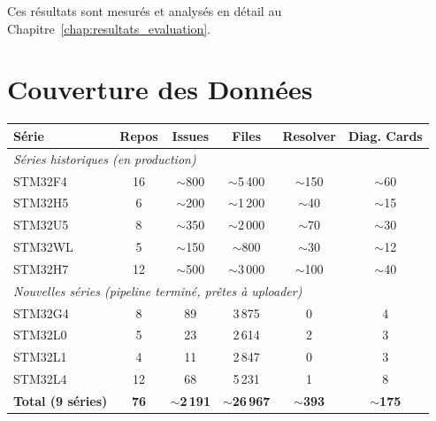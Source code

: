 \documentclass[12pt,a4paper]{report}
\begin{document}
Ces résultats sont mesurés et analysés en détail au Chapitre~\ref{chap:resultats_evaluation}.





\iffalse

\section{Couverture des Données}

\begin{longtable}{lccccc}
\toprule
\textbf{Série} & \textbf{Repos} & \textbf{Issues} & \textbf{Files} & \textbf{Resolver} & \textbf{Diag. Cards} \\
\midrule
\multicolumn{6}{l}{\textit{Séries historiques (en production)}} \\
STM32F4 & 16 & $\sim$800 & $\sim$5\,400 & $\sim$150 & $\sim$60 \\
STM32H5 & 6 & $\sim$200 & $\sim$1\,200 & $\sim$40 & $\sim$15 \\
STM32U5 & 8 & $\sim$350 & $\sim$2\,000 & $\sim$70 & $\sim$30 \\
STM32WL & 5 & $\sim$150 & $\sim$800 & $\sim$30 & $\sim$12 \\
STM32H7 & 12 & $\sim$500 & $\sim$3\,000 & $\sim$100 & $\sim$40 \\
\midrule
\multicolumn{6}{l}{\textit{Nouvelles séries (pipeline terminé, prêtes à uploader)}} \\
STM32G4 & 8 & 89 & 3\,875 & 0 & 4 \\
STM32L0 & 5 & 23 & 2\,614 & 2 & 3 \\
STM32L1 & 4 & 11 & 2\,847 & 0 & 3 \\
STM32L4 & 12 & 68 & 5\,231 & 1 & 8 \\
\midrule
\textbf{Total (9 séries)} & \textbf{76} & $\sim$\textbf{2\,191} & $\sim$\textbf{26\,967} & $\sim$\textbf{393} & $\sim$\textbf{175} \\
\bottomrule
\end{longtable}
\end{document}
